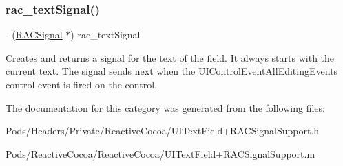 \subsubsection{\texorpdfstring{rac\+\_\+text\+Signal()}{rac\_textSignal()}\hspace{0.1cm}{\footnotesize\ttfamily [3/3]}}
{\footnotesize\ttfamily -\/ (\mbox{\hyperlink{interface_r_a_c_signal}{R\+A\+C\+Signal}} $\ast$) rac\+\_\+text\+Signal \begin{DoxyParamCaption}{ }\end{DoxyParamCaption}}

Creates and returns a signal for the text of the field. It always starts with the current text. The signal sends next when the U\+I\+Control\+Event\+All\+Editing\+Events control event is fired on the control. 

The documentation for this category was generated from the following files\+:\begin{DoxyCompactItemize}
\item 
Pods/\+Headers/\+Private/\+Reactive\+Cocoa/U\+I\+Text\+Field+\+R\+A\+C\+Signal\+Support.\+h\item 
Pods/\+Reactive\+Cocoa/\+Reactive\+Cocoa/U\+I\+Text\+Field+\+R\+A\+C\+Signal\+Support.\+m\end{DoxyCompactItemize}
